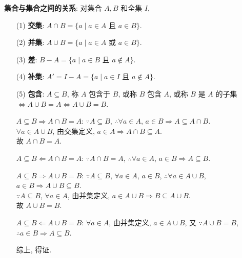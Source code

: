 \documentclass{note}
\begin{document}
\textbf{集合与集合之间的关系}: 对集合 $A,B$ 和全集 $I$,
\begin{itemize}
    \item[(1)] \textbf{交集}: $A\cap B=\{a\mid a\in A\text{ 且 }a\in B\}$.
    \item[(2)] \textbf{并集}: $A\cup B=\{a\mid a\in A\text{ 或 }a\in B\}$.
    \item[(3)] \textbf{差}: $B-A=\{a\mid a\in B\text{ 且 }a\notin A\}$.
    \item[(4)] \textbf{补集}: $A'=I-A=\{a\mid a\in I\text{ 且 }a\notin A\}$.
    \item[(5)] \textbf{包含}: $A\subseteq B$, 称 $A$ 包含于 $B$, 或称 $B$ 包含 $A$, 或称 $B$ 是 $A$ 的子集\\
    $\Longleftrightarrow A\cup B=A\Longleftrightarrow A\cup B=B$.
    \begin{pf}
        \uline{$A\subseteq B\Longrightarrow A\cap B=A$}: $\because A\subseteq B$, $\therefore\forall a\in A$, $a\in B\Longrightarrow A\subseteq A\cap B$.\\
        $\forall a\in A\cup B$, 由交集定义, $a\in A\Longrightarrow A\cap B\subseteq A$.\\
        故 $A\cap B=A$.

        \uline{$A\subseteq B\Longleftarrow A\cap B=A$}: $\because A\cap B=A$, $\therefore\forall a\in A$, $a\in B\Longrightarrow A\subseteq B$.

        \uline{$A\subseteq B\Longrightarrow A\cup B=B$}: $\because A\subseteq B$, $\forall a\in A$, $a\in B$, $\therefore\forall a\in A\cup B$, $a\in B\Longrightarrow A\cup B\subseteq B$.\\
        $\because A\subseteq B$, $\forall a\in A$, 由并集定义, $a\in A\cup B\Longrightarrow B\subseteq A\cup B$.\\
        故 $A\cup B=B$.

        \uline{$A\subseteq B\Longleftarrow A\cup B=B$}: $\forall a\in A$, 由并集定义, $a\in A\cup B$, 又 $\because A\cup B=B$, $\therefore a\in B\Longrightarrow A\subseteq B$.

        综上, 得证.
    \end{pf}
\end{itemize}
\end{document}
